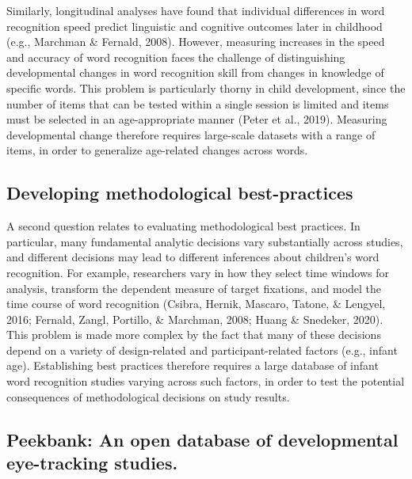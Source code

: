 \documentclass[
  english,
  man,floatsintext]{apa6}
\begin{document}
Similarly, longitudinal analyses have found that individual differences in word recognition speed predict linguistic and cognitive outcomes later in childhood (e.g., Marchman \& Fernald, 2008).
However, measuring increases in the speed and accuracy of word recognition faces the challenge of distinguishing developmental changes in word recognition skill from changes in knowledge of specific words.
This problem is particularly thorny in child development, since the number of items that can be tested within a single session is limited and items must be selected in an age-appropriate manner (Peter et al., 2019).
Measuring developmental change therefore requires large-scale datasets with a range of items, in order to generalize age-related changes across words.

\hypertarget{developing-methodological-best-practices}{%
\subsection{Developing methodological best-practices}\label{developing-methodological-best-practices}}

A second question relates to evaluating methodological best practices.
In particular, many fundamental analytic decisions vary substantially across studies, and different decisions may lead to different inferences about children's word recognition.
For example, researchers vary in how they select time windows for analysis, transform the dependent measure of target fixations, and model the time course of word recognition (Csibra, Hernik, Mascaro, Tatone, \& Lengyel, 2016; Fernald, Zangl, Portillo, \& Marchman, 2008; Huang \& Snedeker, 2020).
This problem is made more complex by the fact that many of these decisions depend on a variety of design-related and participant-related factors (e.g., infant age).
Establishing best practices therefore requires a large database of infant word recognition studies varying across such factors, in order to test the potential consequences of methodological decisions on study results.

\hypertarget{peekbank-an-open-database-of-developmental-eye-tracking-studies.}{%
\subsection{Peekbank: An open database of developmental eye-tracking studies.}\label{peekbank-an-open-database-of-developmental-eye-tracking-studies.}}
\end{document}
